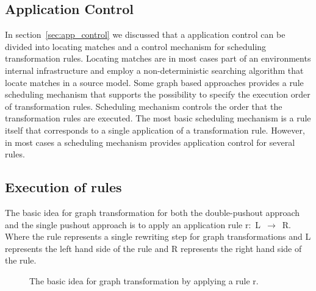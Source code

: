 \subsection{Application Control}

In section~\ref{sec:app_control} we discussed that a application control can be
divided into locating matches and a control mechanism for scheduling
transformation rules. Locating matches are in most cases part of an environments
internal infrastructure and employ a non-deterministic searching algorithm that
locate matches in a source model. Some graph based approaches provides a rule
scheduling mechanism that supports the possibility to specify the execution
order of transformation rules. Scheduling mechanism controls the order that the
transformation rules are executed. The most basic scheduling mechanism is a rule
itself that corresponds to a single application of a transformation rule.
However, in most cases a scheduling mechanism provides application control for
several rules.

\subsection{Execution of rules}
\label{sec:execute_rules}
The basic idea for graph transformation for both the double-pushout
approach and the single pushout approach is to apply an application rule
\mbox{r: L $\longrightarrow$ R}. Where the rule represents a single rewriting
step for graph transformations and L represents the left hand side of the rule and R
represents the right hand side of the rule.

\begin{figure}[H]
	\centering
	\caption[Idea of graph transformation]
	{The basic idea for graph transformation by applying a rule r.}
	\label{fig:GraphTransformationGeneral}
\end{figure}

